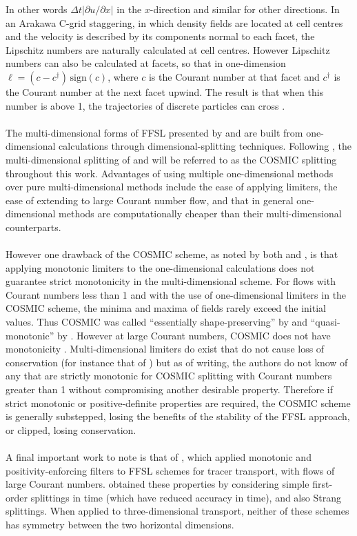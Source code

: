 \documentclass{ametsocV6.1}
\begin{document}
In other words $\Delta t|\partial u /\partial x|$ in the $x$-direction and similar for other directions.
In an Arakawa C-grid staggering, in which density fields are located at cell centres and the velocity is described by its components normal to each facet, the Lipschitz numbers are naturally calculated at cell centres.
However Lipschitz numbers can also be calculated at facets, so that in one-dimension $\ell=(c-c^\dagger) \, \mathrm{sign}(c)$, where $c$ is the Courant number at that facet and $c^\dagger$ is the Courant number at the next facet upwind.
The result is that when this number is above 1, the trajectories of discrete particles can cross \citep{smolarkiewicz1992class}.\\
\\
The multi-dimensional forms of FFSL presented by \citet{leonard1996cosmic} and \citet{lin1996ffsl} are built from one-dimensional calculations through dimensional-splitting techniques.
Following \citet{leonard1996cosmic}, the multi-dimensional splitting of \citet{leonard1996cosmic} and \citet{lin1996ffsl} will be referred to as the COSMIC splitting throughout this work.
Advantages of using multiple one-dimensional methods over pure multi-dimensional methods include the ease of applying limiters, the ease of extending to large Courant number flow, and that in general one-dimensional methods are computationally cheaper than their multi-dimensional counterparts. \\
\\
However one drawback of the COSMIC scheme, as noted by both \citet{leonard1996cosmic} and \citet{lin1996ffsl},  is that applying monotonic limiters to the one-dimensional calculations does not guarantee strict monotonicity in the multi-dimensional scheme.
For flows with Courant numbers less than 1 and with the use of one-dimensional limiters in the COSMIC scheme, the minima and maxima of fields rarely exceed the initial values.
Thus COSMIC was called ``essentially shape-preserving'' by \citet{leonard1996cosmic} and ``quasi-monotonic'' by \citet{putman2007fvtransport}.
However at large Courant numbers, COSMIC does not have monotonicity \citep{leonard1996cosmic,bott2010improving}.
Multi-dimensional limiters do exist that do not cause loss of conservation (for instance that of \citet{thuburn1996multidimensional}) but as of writing, the authors do not know of any that are strictly monotonic for COSMIC splitting with Courant numbers greater than 1 without compromising another desirable property.
Therefore if strict monotonic or positive-definite properties are required, the COSMIC scheme is generally substepped, losing the benefits of the stability of the FFSL approach, or clipped, losing conservation. \\
\\
A final important work to note is that of \citet{skamarock2006limiters}, which applied monotonic and positivity-enforcing filters to FFSL schemes for tracer transport, with flows of large Courant numbers.
\citet{skamarock2006limiters} obtained these properties by considering simple first-order splittings in time (which have reduced accuracy in time), and also Strang splittings.
When applied to three-dimensional transport, neither of these schemes has symmetry between the two horizontal dimensions.
 
\end{document}

